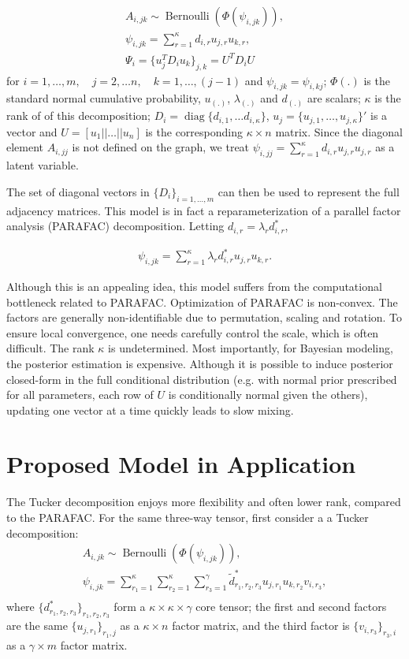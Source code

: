 \documentclass[10pt]{article}
\newcommand{\be}{\begin{equation}\begin{aligned}}
\newcommand{\ee}{\end{aligned}\end{equation}}
\DeclareMathOperator{\Bern}{Bernoulli}
\DeclareMathOperator{\diag}{diag}
\begin{document}
\be
\label{parafac_over_i}
A_{i,jk} \sim \Bern(\Phi( \psi_{i,jk})),\\
\psi_{i,jk}=\sum_{r=1}^{\kappa} d_{i,r} u_{j,r} u_{k,r},\\
\Psi_{i}= \{ u_{j}^T  D_{i} u_{k}\}_{j,k} = U^T D_iU
\ee
for $i=1,\ldots,m, \quad  j=2,\ldots n, \quad k=1,\ldots,(j-1)$ and $\psi_{i,jk}=\psi_{i,kj}$; $\Phi(.)$ is the standard normal cumulative probability, $u_{(.)}$, $\lambda_{(.)}$ and $d_{(.)}$ are scalars; $\kappa$ is the rank of of this decomposition; $D_{i}=\diag\{d_{i,1},\ldots d_{i,\kappa}\}$, $u_j = \{ u_{j,1},\ldots, u_{j,\kappa}\}'$ is a vector and $U=[ u_1 || \ldots || u_n ]$ is the corresponding $ \kappa \times n$ matrix. Since the diagonal element $A_{i,jj}$ is not defined on the graph, we treat $\psi_{i,jj}=\sum_{r=1}^{\kappa} d_{i,r} u_{j,r} u_{j,r}$ as a latent variable.

The set of diagonal vectors in $\{D_i\}_{i=1,\ldots, m}$ can then be used to represent the full adjacency matrices. This model is in fact a reparameterization of a parallel factor analysis (PARAFAC) decomposition. Letting  $d_{i,r} = \lambda_r  d^*_{i,r}$,

\be
\psi_{i,jk}=\sum_{r=1}^{\kappa} \lambda_r  d^*_{i,r} u_{j,r} u_{k,r}.
\ee

Although this is an appealing idea, this model suffers from the computational bottleneck related to PARAFAC. Optimization of PARAFAC is non-convex. The factors are generally non-identifiable due to permutation, scaling and rotation. To ensure local convergence, one needs carefully control the scale, which is often difficult. The rank $\kappa$ is undetermined. Most importantly, for Bayesian modeling, the posterior estimation is expensive. Although it is possible to induce posterior closed-form in the full conditional distribution (e.g. with  normal prior prescribed for all parameters, each row of $U$ is conditionally normal given the others), updating one vector at a time quickly leads to slow mixing.

\section{Proposed Model in Application}

The Tucker decomposition enjoys more flexibility and often lower rank, compared to the PARAFAC. For the same three-way tensor, first consider a a Tucker decomposition:
\be
A_{i,jk} \sim \Bern(\Phi( \psi_{i,jk})),\\
\psi_{i,jk}= \sum_{r_1=1}^{\kappa} \sum_{r_2=1}^{\kappa} \sum_{r_3=1}^{\gamma}\tilde d^*_{r_1,r_2, r_3}  u_{j,r_1} u_{k,r_2} v_{i, r_3},\\
\ee
where $\{d^*_{r_1,r_2, r_3}\}_{r_1,r_2, r_3}$ form a $\kappa \times \kappa \times \gamma$ core tensor; the first and second factors are the same $\{u_{j,r_1}\}_{r_1,j}$ as a $\kappa\times n$ factor matrix, and the third factor is $\{v_{i,r_3}\}_{r_3,i}$ as a $\gamma \times m$ factor matrix.
\end{document}
